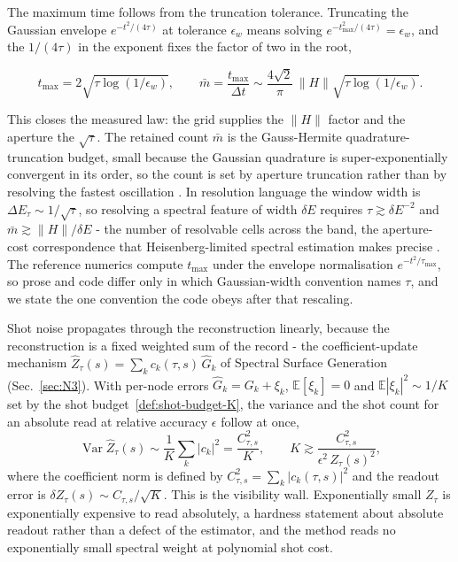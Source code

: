 The maximum time follows from the truncation tolerance. Truncating the Gaussian envelope $e^{-t^2/(4\tau)}$ at tolerance $\epsilon_w$ means solving $e^{-t_{\max}^2/(4\tau)} = \epsilon_w$, and the $1/(4\tau)$ in the exponent fixes the factor of two in the root,
\begin{widetext}
\begin{equation}\label{res:aperture-resolution}
t_{\max} = 2\sqrt{\tau\log(1/\epsilon_w)},
\qquad
\bar m = \frac{t_{\max}}{\Delta t} \sim \frac{4\sqrt{2}}{\pi}\,\|H\|\sqrt{\tau\log(1/\epsilon_w)} .
\end{equation}
\end{widetext}
This closes the measured law: the grid supplies the $\|H\|$ factor and the aperture the $\sqrt{\tau}$. The retained count $\bar m$ is the Gauss-Hermite quadrature-truncation budget, small because the Gaussian quadrature is super-exponentially convergent in its order, so the count is set by aperture truncation rather than by resolving the fastest oscillation \cite{mccaul2025snacks,leamer2024emulation}. In resolution language the window width is $\Delta E_\tau \sim 1/\sqrt{\tau}$, so resolving a spectral feature of width $\delta E$ requires $\tau \gtrsim \delta E^{-2}$ and $\bar m \gtrsim \|H\|/\delta E$ - the number of resolvable cells across the band, the aperture-cost correspondence that Heisenberg-limited spectral estimation makes precise \cite{lin2022heisenberg}. The reference numerics compute $t_{\max}$ under the envelope normalisation $e^{-t^2/\tau_{\max}}$, so prose and code differ only in which Gaussian-width convention names $\tau$, and we state the one convention the code obeys after that rescaling.

Shot noise propagates through the reconstruction linearly, because the reconstruction is a fixed weighted sum of the record - the coefficient-update mechanism $\widehat Z_\tau(s) = \sum_k c_k(\tau,s)\,\widehat G_k$ of Spectral Surface Generation (Sec.~\ref{sec:N3}). With per-node errors $\widehat G_k = G_k + \xi_k$, $\mathbb{E}[\xi_k] = 0$ and $\mathbb{E}|\xi_k|^2 \sim 1/K$ set by the shot budget~\eqref{def:shot-budget-K}, the variance and the shot count for an absolute read at relative accuracy $\epsilon$ follow at once,
\begin{equation}\label{res:shot-floor-visibility-wall}
\operatorname{Var}\widehat Z_\tau(s) \sim \frac{1}{K}\sum_k |c_k|^2 = \frac{C_{\tau,s}^2}{K},
\qquad
K \gtrsim \frac{C_{\tau,s}^2}{\epsilon^2\,Z_\tau(s)^2} ,
\end{equation}
where the coefficient norm is defined by $C_{\tau,s}^2 = \sum_k |c_k(\tau,s)|^2$ and the readout error is $\delta Z_\tau(s) \sim C_{\tau,s}/\sqrt{K}$. This is the visibility wall. Exponentially small $Z_\tau$ is exponentially expensive to read absolutely, a hardness statement about absolute readout rather than a defect of the estimator, and the method reads no exponentially small spectral weight at polynomial shot cost.


